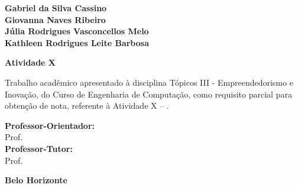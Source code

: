 \begin{folhaderosto}
    \begin{center}
        {\large \textbf{Gabriel da Silva Cassino}} \\
        {\large \textbf{Giovanna Naves Ribeiro}} \\
        {\large \textbf{Júlia Rodrigues Vasconcellos Melo}} \\
        {\large \textbf{Kathleen Rodrigues Leite Barbosa}}

        \vspace{5cm}

        {\large \textbf{Atividade X}}\\[0.3cm]
        {\Large \textbf{\tituloatividade}}

        \vspace{0.25cm}
        {\Large \tipoatividade}

        \vfill
    \end{center}

    \begin{flushright}
        \begin{minipage}{8cm}
            \begin{singlespace}
                {\small
                    Trabalho acadêmico apresentado à disciplina
                    Tópicos III - Empreendedorismo e Inovação,
                    do Curso de Engenharia de Computação,
                    como requisito parcial para obtenção
                    de nota, referente à Atividade X -- \tituloatividade.
                }

                \vspace{0.5cm}
                {\small
                \textbf{Professor-Orientador:} \\ Prof. \orientador \\
                \textbf{Professor-Tutor:} \\ Prof. \tutor
                }
            \end{singlespace}
        \end{minipage}
    \end{flushright}

    \vfill

    \begin{center}
        {\large \textbf{Belo Horizonte}} \\
        {\large \textbf{\anoentrega}}
    \end{center}
\end{folhaderosto}